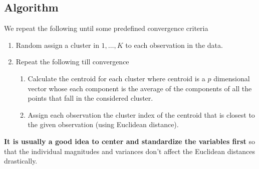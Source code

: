 \documentclass[../statistical_learning_notes.tex]{subfiles}
\begin{document}
    \subsection{Algorithm}
    We repeat the following until some predefined convergence criteria
    \begin{enumerate}
        \item Random assign a cluster in $1, \ldots, K$ to each observation in the data.
        \item Repeat the following till convergence
        \begin{enumerate}
            \item Calculate the centroid for each cluster where centroid is a $p$ dimensional vector whose each component is the average of the components of all the points that fall in the considered cluster.
            \item Assign each observation the cluster index of the centroid that is closest to the given observation (using Euclidean distance).
        \end{enumerate}
    \end{enumerate}

    \textbf{It is usually a good idea to center and standardize the variables first} so that the individual magnitudes and variances don't affect the Euclidean distances drastically.
\end{document}
